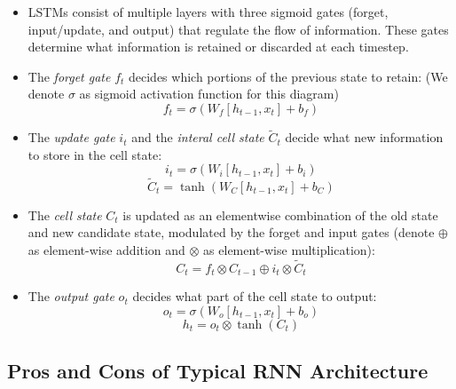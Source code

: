\begin{itemize}
    \item LSTMs consist of multiple layers with three sigmoid gates (forget, input/update, and output) that regulate the flow of information. These gates determine what information is retained or discarded at each timestep.
    \item The \textit{forget gate} \( f_t \) decides which portions of the previous state to retain: (We denote $\sigma$ as sigmoid activation function for this diagram)
    \begin{equation*}
        f_t = \sigma(W_f [h_{t-1}, x_t] + b_f)
    \end{equation*}
    \item The \textit{update gate} \( i_t \) and the \textit{interal cell state} \( \tilde{C}_t \) decide what new information to store in the cell state:
    \begin{equation*}
        i_t = \sigma(W_i [h_{t-1}, x_t] + b_i)
    \end{equation*}
    \begin{equation*}
        \tilde{C}_t = \tanh(W_C [h_{t-1}, x_t] + b_C)
    \end{equation*}
    \item The \textit{cell state} \( C_t \) is updated as an elementwise combination of the old state and new candidate state, modulated by the forget and input gates (denote $\oplus$ as element-wise addition and $\otimes$ as element-wise multiplication):
    \begin{equation*}
        C_t = f_t \otimes C_{t-1} \oplus i_t \otimes \tilde{C}_t
    \end{equation*}
    \item The \textit{output gate} \( o_t \) decides what part of the cell state to output:
    \begin{equation*}
        o_t = \sigma(W_o [h_{t-1}, x_t] + b_o)
    \end{equation*}
    \begin{equation*}
        h_t = o_t \otimes \tanh(C_t)
    \end{equation*}
\end{itemize}




\subsection{Pros and Cons of Typical RNN Architecture}
